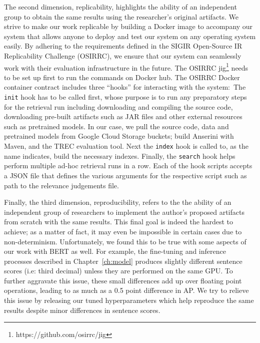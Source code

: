 The second dimension, replicability, highlights the ability of an independent group to obtain the same results using the researcher's original artifacts.
We strive to make our work replicable by building a Docker image to accompany our system that allows anyone to deploy and test our system on any operating system easily.
By adhering to the requirements defined in the SIGIR Open-Source IR Replicability Challenge (OSIRRC), we ensure that our system can seamlessly work with their evaluation infrastructure in the future.
The OSIRRC jig\footnote{https://github.com/osirrc/jig} needs to be set up first to run the commands on Docker hub.
The OSIRRC Docker container contract includes three ``hooks'' for interacting with the system:\
The \texttt{init} hook has to be called first, whose purpose is to run any preparatory steps for the retrieval run including downloading and compiling the source code, downloading pre-built artifacts such as JAR files and other external resources such as pretrained models.
In our case, we pull the source code, data and pretrained models from Google Cloud Storage buckets; build Anserini with Maven, and the TREC evaluation tool.
Next the \texttt{index} hook is called to, as the name indicates, build the necessary indexes.
Finally, the \texttt{search} hook helps perform multiple ad-hoc retrieval runs in a row.
Each of the hook scripts accepts a JSON file that defines the various arguments for the respective script such as path to the relevance judgements file.

Finally, the third dimension, reproducibility, refers to the the ability of an independent group of researchers to implement the author's proposed artifacts from scratch with the same results.
This final goal is indeed the hardest to achieve; as a matter of fact, it may even be impossible in certain cases due to non-determinism.
Unfortunately, we found this to be true with some aspects of our work with BERT as well.
For example, the fine-tuning and inference processes described in Chapter~\ref{ch:model} produces slightly different sentence scores (i.e: third decimal) unless they are performed on the same GPU.
To further aggravate this issue, these small differences add up over floating point operations, leading to as much as a 0.5 point difference in AP.
We try to relieve this issue by releasing our tuned hyperparameters which help reproduce the same results despite minor differences in sentence scores.


